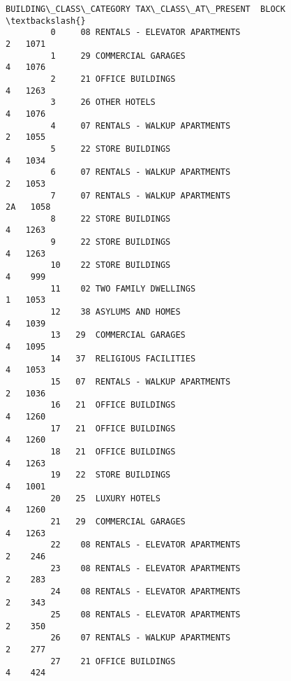 \documentclass[11pt]{article}
\begin{document}
\begin{Verbatim}[commandchars=\\\{\}]
                                   BUILDING\_CLASS\_CATEGORY TAX\_CLASS\_AT\_PRESENT  BLOCK  \textbackslash{}
         0     08 RENTALS - ELEVATOR APARTMENTS                               2   1071   
         1     29 COMMERCIAL GARAGES                                          4   1076   
         2     21 OFFICE BUILDINGS                                            4   1263   
         3     26 OTHER HOTELS                                                4   1076   
         4     07 RENTALS - WALKUP APARTMENTS                                 2   1055   
         5     22 STORE BUILDINGS                                             4   1034   
         6     07 RENTALS - WALKUP APARTMENTS                                 2   1053   
         7     07 RENTALS - WALKUP APARTMENTS                                2A   1058   
         8     22 STORE BUILDINGS                                             4   1263   
         9     22 STORE BUILDINGS                                             4   1263   
         10    22 STORE BUILDINGS                                             4    999   
         11    02 TWO FAMILY DWELLINGS                                        1   1053   
         12    38 ASYLUMS AND HOMES                                           4   1039   
         13   29  COMMERCIAL GARAGES                                          4   1095   
         14   37  RELIGIOUS FACILITIES                                        4   1053   
         15   07  RENTALS - WALKUP APARTMENTS                                 2   1036   
         16   21  OFFICE BUILDINGS                                            4   1260   
         17   21  OFFICE BUILDINGS                                            4   1260   
         18   21  OFFICE BUILDINGS                                            4   1263   
         19   22  STORE BUILDINGS                                             4   1001   
         20   25  LUXURY HOTELS                                               4   1260   
         21   29  COMMERCIAL GARAGES                                          4   1263   
         22    08 RENTALS - ELEVATOR APARTMENTS                               2    246   
         23    08 RENTALS - ELEVATOR APARTMENTS                               2    283   
         24    08 RENTALS - ELEVATOR APARTMENTS                               2    343   
         25    08 RENTALS - ELEVATOR APARTMENTS                               2    350   
         26    07 RENTALS - WALKUP APARTMENTS                                 2    277   
         27    21 OFFICE BUILDINGS                                            4    424   

\end{Verbatim}
\end{document}
